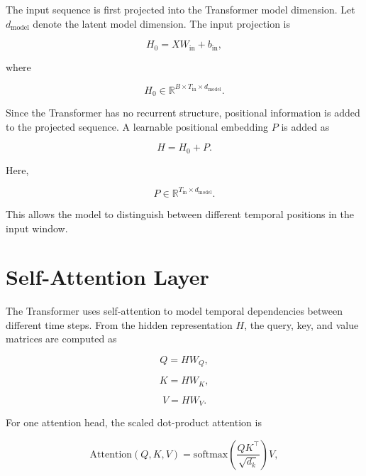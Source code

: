 \documentclass[a4paper]{article}
\begin{document}
        The input sequence is first projected into the Transformer model dimension. Let \(d_{\mathrm{model}}\) denote the latent model dimension. The input projection is
        
        \[
            H_0
            =
            XW_{\mathrm{in}}
            +
            b_{\mathrm{in}},
        \]
        
        where
        
        \[
            H_0
            \in
            \mathbb{R}^{B \times T_{\mathrm{in}} \times d_{\mathrm{model}}}.
        \]
        
        Since the Transformer has no recurrent structure, positional information is added to the projected sequence. A learnable positional embedding \(P\) is added as
        
        \[
            H
            =
            H_0
            +
            P.
        \]
        
        Here,
        
        \[
            P
            \in
            \mathbb{R}^{T_{\mathrm{in}} \times d_{\mathrm{model}}}.
        \]
        
        This allows the model to distinguish between different temporal positions in the input window.
    
    
    \section{Self-Attention Layer}
        
        The Transformer uses self-attention to model temporal dependencies between different time steps. From the hidden representation \(H\), the query, key, and value matrices are computed as
        
        \[
            Q
            =
            HW_Q,
        \]
        
        \[
            K
            =
            HW_K,
        \]
        
        \[
            V
            =
            HW_V.
        \]
        
        For one attention head, the scaled dot-product attention is
        
        \[
            \mathrm{Attention}
            \left(
                Q,
                K,
                V
            \right)
            =
            \mathrm{softmax}
            \left(
                \frac{
                    QK^{\top}
                }{
                    \sqrt{d_k}
                }
            \right)
            V,
        \]
        
\end{document}
